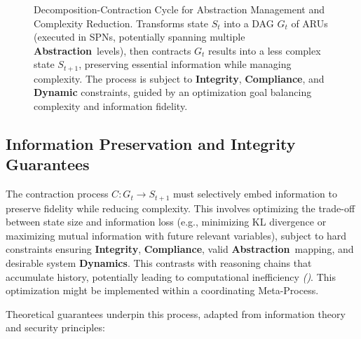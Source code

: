\documentclass[12pt,a4paper]{report}
\renewcommand{\citep}[1]{\textit{\scriptsize{(\cite{#1})}}}
\newcommand{\Integrity}{\textbf{Integrity}}
\newcommand{\Abstraction}{\textbf{Abstraction}}
\newcommand{\Dynamics}{\textbf{Dynamics}}
\begin{document}
\begin{figure}[ht]
		\caption[Decomposition-Contraction Cycle]{Decomposition-Contraction Cycle for Abstraction Management and Complexity Reduction. Transforms state $S_t$ into a DAG $G_t$ of ARUs (executed in SPNs, potentially spanning multiple \Abstraction\ levels), then contracts $G_t$ results into a less complex state $S_{t+1}$, preserving essential information while managing complexity. The process is subject to \Integrity, \textbf{Compliance}, and \textbf{Dynamic} constraints, guided by an optimization goal balancing complexity and information fidelity.}
		\label{fig:decomposition-contraction}
	\end{figure}
	
	\subsection{Information Preservation and Integrity Guarantees}
	\label{sec:2-4-5_and_6}
	
	The contraction process $C: G_t \rightarrow S_{t+1}$ must selectively embed information to preserve fidelity while reducing complexity. This involves optimizing the trade-off between state size and information loss (e.g., minimizing KL divergence or maximizing mutual information with future relevant variables), subject to hard constraints ensuring \Integrity, \textbf{Compliance}, valid \Abstraction\ mapping, and desirable system \Dynamics. This contrasts with reasoning chains that accumulate history, potentially leading to computational inefficiency \citep{Teng2025AtomOfThoughtsRef}. This optimization might be implemented within a coordinating Meta-Process.
	
	Theoretical guarantees underpin this process, adapted from information theory and security principles:
	
\end{document}
